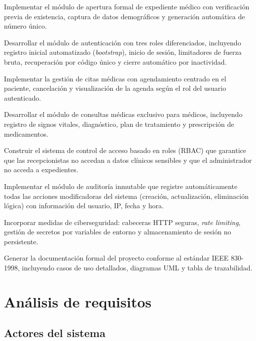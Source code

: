\documentclass[11pt,a4paper]{article}
\begin{document}
\begin{description}[leftmargin=2.5cm,style=nextline]
    \item[\textbf{OE1:}] Implementar el módulo de apertura formal de expediente médico con verificación previa de existencia, captura de datos demográficos y generación automática de número único.
    \item[\textbf{OE2:}] Desarrollar el módulo de autenticación con tres roles diferenciados, incluyendo registro inicial automatizado (\textit{bootstrap}), inicio de sesión, limitadores de fuerza bruta, recuperación por código único y cierre automático por inactividad.
    \item[\textbf{OE3:}] Implementar la gestión de citas médicas con agendamiento centrado en el paciente, cancelación y visualización de la agenda según el rol del usuario autenticado.
    \item[\textbf{OE4:}] Desarrollar el módulo de consultas médicas exclusivo para médicos, incluyendo registro de signos vitales, diagnóstico, plan de tratamiento y prescripción de medicamentos.
    \item[\textbf{OE5:}] Construir el sistema de control de acceso basado en roles (RBAC) que garantice que las recepcionistas no accedan a datos clínicos sensibles y que el administrador no acceda a expedientes.
    \item[\textbf{OE6:}] Implementar el módulo de auditoría inmutable que registre automáticamente todas las acciones modificadoras del sistema (creación, actualización, eliminación lógica) con información del usuario, IP, fecha y hora.
    \item[\textbf{OE7:}] Incorporar medidas de ciberseguridad: cabeceras HTTP seguras, \textit{rate limiting}, gestión de secretos por variables de entorno y almacenamiento de sesión no persistente.
    \item[\textbf{OE8:}] Generar la documentación formal del proyecto conforme al estándar IEEE 830-1998, incluyendo casos de uso detallados, diagramas UML y tabla de trazabilidad.
\end{description}

\section{Análisis de requisitos}

\subsection{Actores del sistema}
\end{document}
